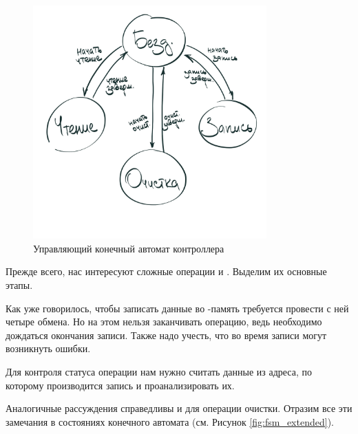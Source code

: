 \begin{figure}[H]
\centering
% 
\includegraphics[width=0.8\textwidth]{./images/lab_6/fsm_simple}
\caption{Управляющий конечный автомат контроллера }
\label{fig:fsm_somple}
\end{figure}

\par{Прежде всего, нас интересуют сложные операции  и . Выделим их основные этапы.}

\par{Как уже говорилось, чтобы записать данные во -память требуется провести с ней четыре обмена. Но на этом нельзя заканчивать операцию, ведь необходимо дождаться окончания записи. Также надо учесть, что во время записи могут возникнуть ошибки.}
\par{Для контроля статуса операции нам нужно считать данные из адреса, по которому производится запись и проанализировать их.}
\par{Аналогичные рассуждения справедливы и для операции очистки. Отразим все эти замечания в состояниях конечного автомата (см. Рисунок \ref{fig:fsm_extended}).}

